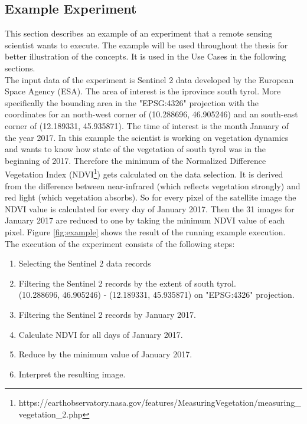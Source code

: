 \documentclass[draft,final]{vutinfth} %
\begin{document}
\subsection{Example Experiment}\label{example}

This section describes an example of an experiment that a remote sensing scientist wants to execute. The example will be used throughout the thesis for better illustration of the concepts. It is used in the Use Cases in the following sections. \\
The input data of the experiment is Sentinel 2 data developed by the European Space Agency (ESA). The area of interest is the iprovince south tyrol. More specifically the bounding area in the "EPSG:4326" projection with the coordinates for an north-west corner of (10.288696, 46.905246) and an south-east corner of (12.189331, 45.935871). The time of interest is the month January of the year 2017. In this example the scientist is working on vegetation dynamics and wants to know how state of the vegetation of south tyrol was in the beginning of 2017. Therefore the minimum of the Normalized Difference Vegetation Index (NDVI\footnote{https://earthobservatory.nasa.gov/features/MeasuringVegetation/measuring\_vegetation\_2.php}) gets calculated on the data selection. It is derived from the difference between near-infrared (which reflects vegetation strongly) and red light (which vegetation absorbs). So for every pixel of the satellite image the NDVI value is calculated for every day of January 2017. Then the 31 images for January 2017 are reduced to one by taking the minimum NDVI value of each pixel. Figure \ref{fig:example} shows the result of the running example execution.\\

The execution of the experiment consists of the following steps:

\begin{enumerate}
	\item Selecting the Sentinel 2 data records
	\item Filtering the Sentinel 2 records by the extent of south tyrol. \\(10.288696, 46.905246) - (12.189331, 45.935871) on "EPSG:4326" projection.
	\item Filtering the Sentinel 2 records by January 2017.
	\item Calculate NDVI for all days of January 2017.
	\item Reduce by the minimum value of January 2017.
	\item Interpret the resulting image.
\end{enumerate}
\end{document}
